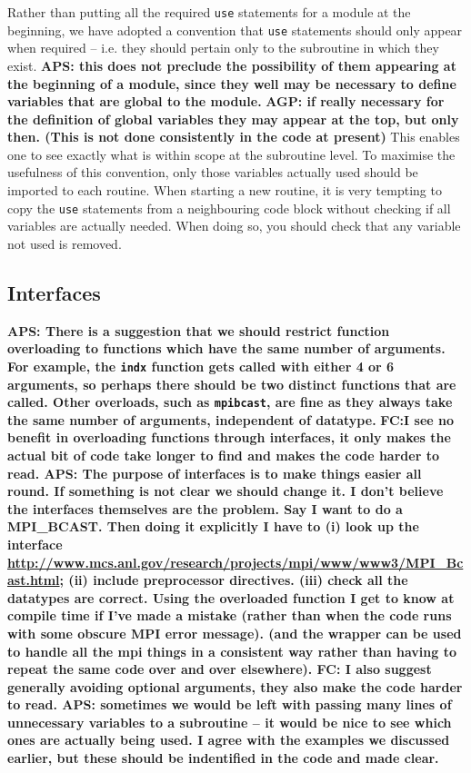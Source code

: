 \documentclass[12pt,twoside,notitlepage,a4paper]{article}
\newcommand{\code}[1]{\texttt{#1}}
\begin{document}
Rather than putting all the required \code{use} statements for a module at the beginning,
we have adopted a convention that \code{use} statements should only appear when required -- i.e.
they should pertain only to the subroutine in which they exist. 
{\bf APS: this does not preclude the possibility of them appearing at the beginning of a module,
since they well may be necessary to define variables that are global to the module.}
{\bf AGP: if really necessary for the definition of global variables they may appear at the 
top, but only then. (This is not done consistently in the code at present)}
This enables one to see exactly what is within scope at the subroutine level.
To maximise the usefulness of this convention, only those variables
actually used should be imported to each routine. When starting a new routine, it
is very tempting to copy the \code{use} statements from a neighbouring code block without
checking if all variables are actually needed. When doing so, you should check that
any variable not used is removed.


\subsection{Interfaces}

{\bf APS: There is a suggestion that we should restrict function overloading
to functions which have the same number of arguments. For example, the
\code{indx} function gets called with either 4 or 6 arguments, so perhaps
there should be two distinct functions that are called. Other overloads, such
as \code{mpibcast}, are fine as they always take the same number of arguments,
independent of datatype.}
{\bf FC:I see no benefit in overloading functions through interfaces, it only makes 
the actual bit of code take longer to find and makes the code harder to read. APS:
The purpose of interfaces is to make things easier all round. If something is not clear
we should change it. I don't believe the interfaces themselves are the problem.
Say I want to do a MPI_BCAST. Then doing it explicitly I have to (i) look up the interface
\url{http://www.mcs.anl.gov/research/projects/mpi/www/www3/MPI_Bcast.html}; (ii) include
preprocessor directives. (iii) check all the datatypes are correct. Using the 
overloaded function I get to know at compile time if I've made a mistake (rather than when the code
runs with some obscure MPI error message). (and the
wrapper can be used to handle all the mpi things in a consistent way rather than having to
repeat the same code over and over elsewhere).
FC: I also suggest generally avoiding optional arguments, they also make the code harder to read. APS:
sometimes we would be left with passing many lines of unnecessary variables to
a subroutine -- it would be nice to see which ones are actually being used. I agree with the examples
we discussed earlier, but these should be indentified in the
code and made clear.}
\end{document}
